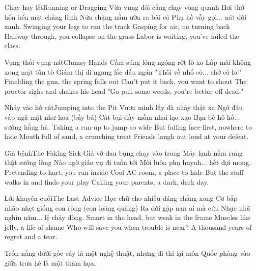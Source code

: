 \begin{tutuyetbox}{Chạy hay lết}{Running or Dragging}
Vừa vung đôi cẳng chạy vòng quanh
Hơi thở hổn hển mặt chẳng lành
Nửa chặng nằm ườn ra bãi cỏ
Phụ hồ vẫy gọi... nát đời xanh.
\tcblower
Swinging your legs to run the track 
Gasping for air, no turning back 
Halfway through, you collapse on the grass 
Labor is waiting, you've failed the class.
\end{tutuyetbox}

\begin{tutuyetbox}{Vụng thối vụng nát}{Clumsy Hands}
Cầm súng lóng ngóng rớt lò xo
Lắp mãi không xong mặt tũn tò
Giám thị đi ngang lắc đầu ngán
"Thôi về nhổ cỏ... chớ có lo!"
\tcblower
Fumbling the gun, the spring falls out 
Can't put it back, you want to shout 
The proctor sighs and shakes his head 
"Go pull some weeds, you're better off dead."
\end{tutuyetbox}

\begin{tutuyetbox}{Nhảy vào hố cát}{Jumping into the Pit}
Vươn mình lấy đà nhảy thật xa
Ngờ đâu vấp ngã mặt như hoa (bấy bá)
Cát bụi đầy mồm nhai lạo xạo
Bạn bè hô hố... sướng hằng hà.
\tcblower
Taking a run-up to jump so wide 
But falling face-first, nowhere to hide 
Mouth full of sand, a crunching treat 
Friends laugh out loud at your defeat.
\end{tutuyetbox}

\begin{tutuyetbox}{Giả bệnh}{The Faking Sick}
Giả vờ đau bụng chạy vào trong
Máy lạnh nằm rung thật sướng lòng
Nào ngờ giáo vụ đi tuần tới
Mời luôn phụ huynh... hết đợi mong.
\tcblower
Pretending to hurt, you run inside 
Cool AC room, a place to hide 
But the staff walks in and finds your play 
Calling your parents, a dark, dark day.
\end{tutuyetbox}

\begin{tutuyetbox}{Lời khuyên cuối}{The Last Advice}
Học chữ cho nhiều dáng chẳng xong
Cơ bắp nhão nhẹt giống con ròng (con loăng quăng)
Ra đời gặp nạn ai mà cứu
Nhục nhã nghìn năm... lệ chảy dòng.
\tcblower
Smart in the head, but weak in the frame 
Muscles like jelly, a life of shame 
Who will save you when trouble is near? 
A thousand years of regret and a tear.
\end{tutuyetbox}

\begin{ghichu}
Trốn nắng dưới gốc cây là một nghệ thuật, nhưng đi thi lại môn Quốc phòng vào giữa trưa hè là một thảm họa.
\end{ghichu}